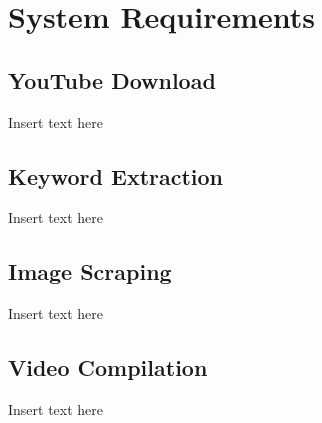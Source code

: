 \chapter{System Requirements}

\section{YouTube Download}

Insert text here

\section{Keyword Extraction}

Insert text here

\section{Image Scraping}

Insert text here

\section{Video Compilation}

Insert text here